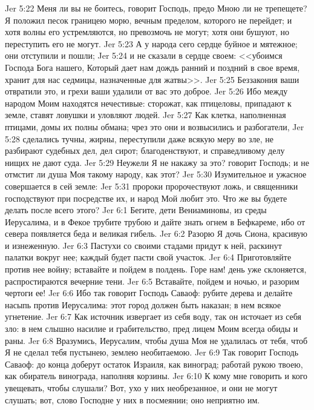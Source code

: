 \vs Jer 5:22 Меня ли вы не боитесь, говорит Господь, предо Мною ли не трепещете? Я положил песок границею морю, вечным пределом, которого не перейдет; и хотя волны его устремляются, но превозмочь не могут; хотя они бушуют, но переступить его не могут.
\vs Jer 5:23 А у народа сего сердце буйное и мятежное; они отступили и пошли;
\vs Jer 5:24 и не сказали в сердце своем: <<убоимся Господа Бога нашего, Который дает нам дождь ранний и поздний в свое время, хранит для нас седмицы, назначенные для жатвы>>.
\vs Jer 5:25 Беззакония ваши отвратили это, и грехи ваши удалили от вас это доброе.
\vs Jer 5:26 Ибо между народом Моим находятся нечестивые: сторожат, как птицеловы, припадают к земле, ставят ловушки и уловляют людей.
\vs Jer 5:27 Как клетка, наполненная птицами, домы их полны обмана; чрез это они и возвысились и разбогатели,
\vs Jer 5:28 сделались тучны, жирны, переступили даже всякую меру во зле, не разбирают судебных дел, дел сирот; благоденствуют, и справедливому делу нищих не дают суда.
\vs Jer 5:29 Неужели Я не накажу за это? говорит Господь; и не отмстит ли душа Моя такому народу, как этот?
\vs Jer 5:30 Изумительное и ужасное совершается в сей земле:
\vs Jer 5:31 пророки пророчествуют ложь, и священники господствуют при посредстве их, и народ Мой любит это. Что же вы будете делать после всего этого?
\vs Jer 6:1 Бегите, дети Вениаминовы, из среды Иерусалима, и в Фекое трубите трубою и дайте знать огнем в Бефкареме, ибо от севера появляется беда и великая гибель.
\vs Jer 6:2 Разорю Я дочь Сиона, красивую и изнеженную.
\vs Jer 6:3 Пастухи со своими стадами придут к ней, раскинут палатки вокруг нее; каждый будет пасти свой участок.
\vs Jer 6:4 Приготовляйте против нее войну; вставайте и пойдем в полдень. Горе нам! день уже склоняется, распростираются вечерние тени.
\vs Jer 6:5 Вставайте, пойдем и ночью, и разорим чертоги ее!
\vs Jer 6:6 Ибо так говорит Господь Саваоф: рубите дерева и делайте насыпь против Иерусалима: этот город должен быть наказан; в нем всякое угнетение.
\vs Jer 6:7 Как источник извергает из себя воду, так он источает из себя зло: в нем слышно насилие и грабительство, пред лицем Моим всегда обиды и раны.
\vs Jer 6:8 Вразумись, Иерусалим, чтобы душа Моя не удалилась от тебя, чтоб Я не сделал тебя пустынею, землею необитаемою.
\rsbpar\vs Jer 6:9 Так говорит Господь Саваоф: до конца доберут остаток Израиля, как виноград; работай рукою твоею, как обиратель винограда, наполняя корзины.
\vs Jer 6:10 К кому мне говорить и кого увещевать, чтобы слушали? Вот, ухо у них необрезанное, и они не могут слушать; вот, слово Господне у них в посмеянии; оно неприятно им.
